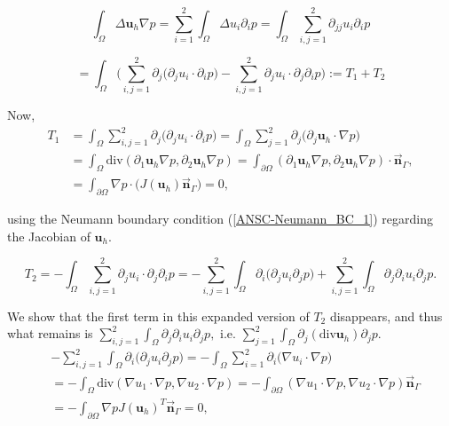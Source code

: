 \documentclass[11pt]{article}
\begin{document}
\[ \int_\Omega \Delta \mathbf{u}_h \nabla p = \sum_{i=1}^2 \int_\Omega \Delta u_i \partial_i p = \int_\Omega \sum_{i,j=1}^2 \partial_{jj} u_i \partial_i p \]

\[ = \int_\Omega \bigg ( \sum_{i,j = 1}^2 \partial_j \big (\partial_j u_i \cdot \partial_i p \big) - \sum_{i,j = 1}^2 \partial_j u_i \cdot \partial_j \partial_i p \bigg ) := T_1 + T_2\]

Now,
\begin{equation}
  \begin{split}
T_1 & = \int_\Omega \sum_{i,j = 1}^2 \partial_j \big (\partial_j u_i \cdot \partial_i p \big) = \int_\Omega \sum_{j=1}^2 \partial_j \big( \partial_j \mathbf{u}_h \cdot \nabla p \big)  \\
& = \int_\Omega \text{div}(\partial_1 \mathbf{u}_h \nabla p, \partial_2 \mathbf{u}_h \nabla p )= \int_{\partial \Omega} (\partial_1 \mathbf{u}_h \nabla p, \partial_2 \mathbf{u}_h \nabla p ) \cdot \vec{\mathbf{n}}_\Gamma, \\
& =\int_{\partial \Omega} \nabla p \cdot \big(J(\mathbf{u}_h) \vec{\mathbf{n}}_\Gamma \big) = 0,
  \end{split}
\end{equation}

using the Neumann boundary condition (\ref{ANSC-Neumann_BC_1}) regarding the Jacobian of $\mathbf{u}_h.$

\[ T_2 = - \int_\Omega \sum_{i,j = 1}^2 \partial_j u_i \cdot \partial_j \partial_i p = - \sum_{i,j = 1}^2 \int_\Omega \partial_i \big( \partial_j u_i \partial_j p \big) + \sum_{i,j = 1}^2 \int_\Omega \partial_j \partial_i u_i \partial_j p. \]

We show that the first term in this expanded version of $T_2$ disappears, and thus what remains is $ \sum_{i,j = 1}^2 \int_\Omega \partial_j \partial_i u_i \partial_j p,$ i.e. $ \sum_{j = 1}^2 \int_\Omega \partial_j (\text{div} \mathbf{u}_h) \partial_j p.$
\begin{equation}
  \begin{split}
 & - \sum_{i,j = 1}^2 \int_\Omega \partial_i \big( \partial_j u_i \partial_j p \big) = - \int_\Omega \sum_{i=1}^2 \partial_i \big( \nabla u_i \cdot \nabla p \big) \\
 & = - \int_\Omega \text{div} (\nabla u_1 \cdot \nabla p, \nabla u_2 \cdot \nabla p) = - \int_{\partial \Omega} (\nabla u_1 \cdot \nabla p, \nabla u_2 \cdot \nabla p) \vec{\mathbf{n}}_\Gamma \\
 & = - \int_{\partial \Omega} \nabla p J(\mathbf{u}_h)^T \vec{\mathbf{n}}_\Gamma = 0,
  \end{split}
\end{equation}
\end{document}
